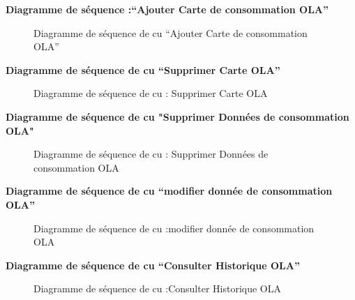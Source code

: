 \documentclass[a4paper,11pt]{report}
\begin{document}
\newpage
\textbf{Diagramme de séquence :“Ajouter Carte de consommation OLA” }

\begin{figure}[H]
  \centering
  \setlength{\fboxrule}{1pt}
  \setlength{\fboxsep}{3pt}
  \caption{Diagramme de séquence de cu “Ajouter Carte de consommation OLA”
 }
  \label{fig:clone-result}
\end{figure}

\newpage
\textbf{Diagramme de séquence de cu “Supprimer Carte OLA”
 }

\begin{figure}[H]
  \centering
  \setlength{\fboxrule}{1pt}
  \setlength{\fboxsep}{3pt}
  \caption{ Diagramme de séquence de cu : Supprimer Carte OLA
 }
  \label{fig:clone-result}
\end{figure}




\newpage
\textbf{ Diagramme de séquence de cu "Supprimer  Données de consommation OLA"
 }

\begin{figure}[H]
  \centering
  \setlength{\fboxrule}{1pt}
  \setlength{\fboxsep}{3pt}
  \caption{ Diagramme de séquence de cu : Supprimer  Données de consommation OLA
 }
  \label{fig:clone-result}
\end{figure}


\newpage
\textbf{ Diagramme de séquence de cu “modifier donnée de consommation OLA”}

\begin{figure}[H]
  \centering
  \setlength{\fboxrule}{1pt}
  \setlength{\fboxsep}{3pt}
  \caption{ Diagramme de séquence de cu :modifier donnée de consommation OLA
 }
  \label{fig:clone-result}
\end{figure}




\newpage
\textbf{ Diagramme de séquence de cu “Consulter Historique OLA”}

\begin{figure}[H]
  \centering
  \setlength{\fboxrule}{1pt}
  \setlength{\fboxsep}{3pt}
  \caption{ Diagramme de séquence de cu :Consulter Historique OLA
 }
  \label{fig:clone-result}
\end{figure}
\end{document}
